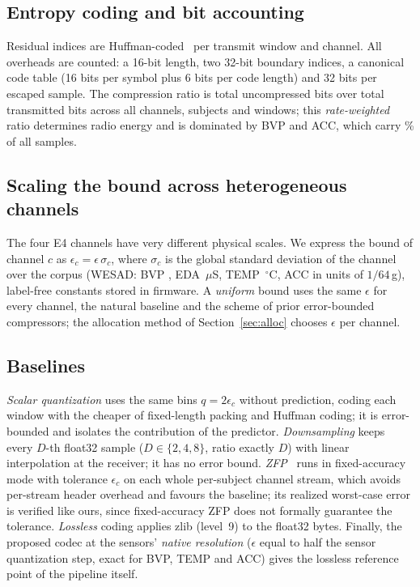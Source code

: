 \documentclass[journal,twoside,web]{ieeecolor}
\begin{document}
\subsection{Entropy coding and bit accounting}
Residual indices are Huffman-coded~\cite{huffman1952} per transmit window and channel. All overheads are counted: a 16-bit length, two 32-bit boundary indices, a canonical code table (16 bits per symbol plus 6 bits per code length) and 32 bits per escaped sample. The compression ratio is total uncompressed bits over total transmitted bits across all channels, subjects and windows; this \emph{rate-weighted} ratio determines radio energy and is dominated by BVP and ACC, which carry \pctSamplesBVPACC\% of all samples.

\subsection{Scaling the bound across heterogeneous channels}
\label{sec:scale}
The four E4 channels have very different physical scales. We express the bound of channel $c$ as $\epsilon_c=\epsilon\,\sigma_c$, where $\sigma_c$ is the global standard deviation of the channel over the corpus (WESAD: BVP \sigmaBVP, EDA \sigmaEDA\,$\mu$S, TEMP \sigmaTEMP\,$^\circ$C, ACC \sigmaACC{} in units of $1/64$\,g), label-free constants stored in firmware. A \emph{uniform} bound uses the same $\epsilon$ for every channel, the natural baseline and the scheme of prior error-bounded compressors; the allocation method of Section~\ref{sec:alloc} chooses $\epsilon$ per channel.

\subsection{Baselines}
\emph{Scalar quantization} uses the same bins $q=2\epsilon_c$ without prediction, coding each window with the cheaper of fixed-length packing and Huffman coding; it is error-bounded and isolates the contribution of the predictor. \emph{Downsampling} keeps every $D$-th float32 sample ($D\in\{2,4,8\}$, ratio exactly $D$) with linear interpolation at the receiver; it has no error bound. \emph{ZFP}~\cite{lindstrom2014} runs in fixed-accuracy mode with tolerance $\epsilon_c$ on each whole per-subject channel stream, which avoids per-stream header overhead and favours the baseline; its realized worst-case error is verified like ours, since fixed-accuracy ZFP does not formally guarantee the tolerance. \emph{Lossless} coding applies zlib (level~9) to the float32 bytes. Finally, the proposed codec at the sensors' \emph{native resolution} ($\epsilon$ equal to half the sensor quantization step, exact for BVP, TEMP and ACC) gives the lossless reference point of the pipeline itself.
\end{document}
